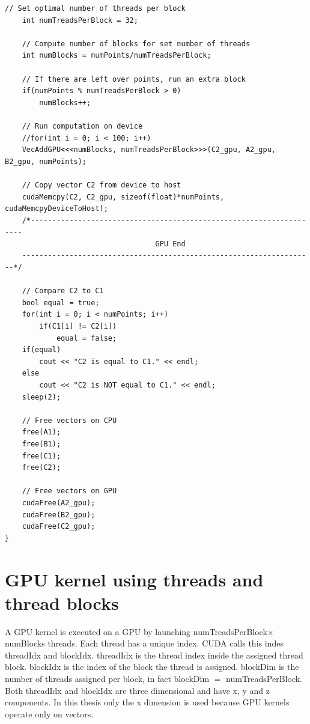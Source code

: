 \begin{lstlisting}[style=myCUDAstyle,caption={Comparison of CPU verse GPU code.},label={code:GPUvsCPU}]
	// Set optimal number of threads per block
	int numTreadsPerBlock = 32;

	// Compute number of blocks for set number of threads
	int numBlocks = numPoints/numTreadsPerBlock;

	// If there are left over points, run an extra block
	if(numPoints % numTreadsPerBlock > 0)
		numBlocks++;

	// Run computation on device
	//for(int i = 0; i < 100; i++)
	VecAddGPU<<<numBlocks, numTreadsPerBlock>>>(C2_gpu, A2_gpu, B2_gpu, numPoints);

	// Copy vector C2 from device to host
	cudaMemcpy(C2, C2_gpu, sizeof(float)*numPoints, cudaMemcpyDeviceToHost);
	/*--------------------------------------------------------------------
                               	   GPU End
	--------------------------------------------------------------------*/

	// Compare C2 to C1
	bool equal = true;
	for(int i = 0; i < numPoints; i++)
		if(C1[i] != C2[i])
			equal = false;
	if(equal)
		cout << "C2 is equal to C1." << endl;
	else
		cout << "C2 is NOT equal to C1." << endl;
	sleep(2);

	// Free vectors on CPU
	free(A1);
	free(B1);
	free(C1);
	free(C2);

	// Free vectors on GPU
	cudaFree(A2_gpu);
	cudaFree(B2_gpu);
	cudaFree(C2_gpu);
}
\end{lstlisting}
\doublespacing

\section{GPU kernel using threads and thread blocks}
A GPU kernel is executed on a GPU by launching numTreadsPerBlock$\times$numBlocks 
threads.
Each thread has a unique index.
CUDA calls this indes threadIdx and blockIdx.
threadIdx is the thread index inside the assigned thread block.
blockIdx is the index of the block the thread is assigned.
blockDim is the number of threads assigned per block, in fact blockDim $=$ numTreadsPerBlock.
Both threadIdx and blockIdx are three dimensional and have x, y and z components.
In this thesis only the x dimension is used because GPU kernels operate only on vectors.

